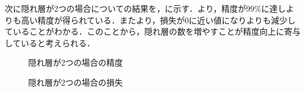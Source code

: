 \documentclass{eithesis}
\begin{document}
  次に隠れ層が2つの場合についての結果を，に示す．より，精度が99\%に達しよりも高い精度が得られている．またより，損失が0に近い値になりよりも減少していることがわかる．このことから，隠れ層の数を増やすことが精度向上に寄与していると考えられる．
  \begin{figure}[htbp]
    \centering
    \caption{隠れ層が2つの場合の精度}
    \label{fig_hidden2_acc}
  \end{figure}
  \begin{figure}[htbp]
    \centering
    \caption{隠れ層が2つの場合の損失}
    \label{fig_hidden2_loss}
  \end{figure}
\end{document}
